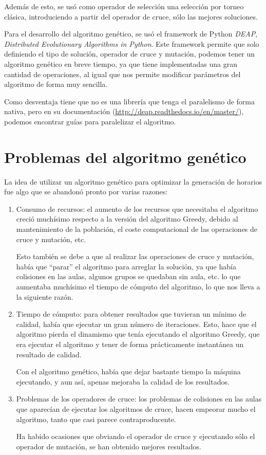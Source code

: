 Además de esto, se usó como operador de selección una selección por torneo clásica, introduciendo a partir del operador de cruce, sólo las mejores soluciones.

Para el desarrollo del algoritmo genético, se usó el framework de Python \textit{DEAP}, \textit{Distributed Evolutionary Algorithms in Python}. Este framework permite que solo definiendo el tipo de solución, operador de cruce y mutación, podemos tener un algoritmo genético en breve tiempo, ya que tiene implementadas una gran cantidad de operaciones, al igual que nos permite modificar parámetros del algoritmo de forma muy sencilla. 

Como desventaja tiene que no es una librería que tenga el paralelismo de forma nativa, pero en su documentación (\url{http://deap.readthedocs.io/en/master/}), podemos encontrar guías para paralelizar el algoritmo.

\section{Problemas del algoritmo genético}

La idea de utilizar un algoritmo genético para optimizar la generación de horarios fue algo que se abandonó pronto por varias razones:

\begin{enumerate}
	\item Consumo de recursos: el aumento de los recursos que necesitaba el algoritmo creció muchísimo respecto a la versión del algoritmo Greedy, debido al mantenimiento de la población, el coste computacional de las operaciones de cruce y mutación, etc.

	Esto también se debe a que al realizar las operaciones de cruce y mutación, había que ``parar'' el algoritmo para arreglar la solución, ya que había colisiones en las aulas, algunos grupos se quedaban sin aula, etc. lo que aumentaba muchísimo el tiempo de cómputo del algoritmo, lo que nos lleva a la siguiente razón.

	\item Tiempo de cómputo: para obtener resultados que tuvieran un mínimo de calidad, había que ejecutar un gran número de iteraciones. Esto, hace que el algoritmo pierda el dinamismo que tenía ejecutando el algoritmo Greedy, que era ejecutar el algoritmo y tener de forma prácticamente instantánea un resultado de calidad. 

	Con el algoritmo genético, había que dejar bastante tiempo la máquina ejecutando, y aun así, apenas mejoraba la calidad de los resultados.

	\item Problemas de los operadores de cruce: los problemas de colisiones en las aulas que aparecían de ejecutar los algoritmos de cruce, hacen empeorar mucho el algoritmo, tanto que casi parece contraproducente. 

	Ha habido ocasiones que obviando el operador de cruce y ejecutando sólo el operador de mutación, se han obtenido mejores resultados.
\end{enumerate}

